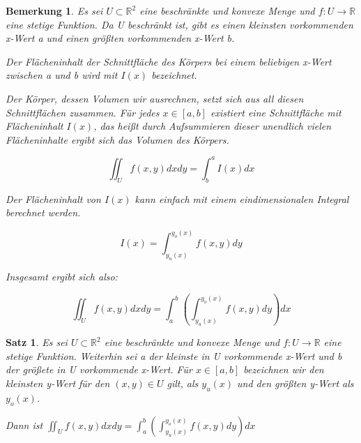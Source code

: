 \documentclass[12pt,a4paper]{scrreprt}
\newtheorem{bemerkung}[defi]{Bemerkung}
\newtheorem{satz}[defi]{Satz}
\begin{document}
	\begin{bemerkung}

		Es sei $U\subset\mathbb{R}^2$ eine beschränkte und konvexe Menge und $f:U\to\mathbb{R}$ eine stetige Funktion. Da U beschränkt ist, gibt es einen kleinsten vorkommenden x-Wert a und einen größten vorkommenden x-Wert b.

		Der Flächeninhalt der Schnittfläche des Körpers bei einem beliebigen x-Wert zwischen a und b wird mit $I(x)$ bezeichnet.

		Der Körper, dessen Volumen wir ausrechnen, setzt sich aus all diesen Schnittflächen zusammen. Für jedes $x\in [a,b]$ existiert eine Schnittfläche mit Flächeninhalt $I(x)$, das heißt durch Aufsummieren dieser unendlich vielen Flächeninhalte ergibt sich das Volumen des Körpers.

		\[\iint_U f(x,y)dxdy = \int^a_b I(x)dx\]

		Der Flächeninhalt von $I(x)$ kann einfach mit einem eindimensionalen Integral berechnet werden.

		\[I(x) = \int^{y_o(x)}_{y_u(x)} f(x,y)dy \]

		Insgesamt ergibt sich also:

		\[\iint_U f(x,y)dxdy = \int^b_a \left(\int^{y_o(x)}_{y_u(x)} f(x,y)dy\right)dx\]
	\end{bemerkung}

	\begin{satz}
		Es sei $U\subset\mathbb{R}^2$ eine beschränkte und konvexe Menge und $f:U\to\mathbb{R}$ eine stetige Funktion. Weiterhin sei a der kleinste in U vorkommende x-Wert und b der größete in U vorkommende x-Wert. Für $x\in [a,b]$ bezeichnen wir den kleinsten y-Wert für den $(x,y) \in U$ gilt, als $y_u(x)$ und den größten y-Wert als $y_o(x)$.

		Dann ist $\iint_U f(x,y)dxdy = \int^b_a \left(\int^{y_o(x)}_{y_u(x)} f(x,y)dy\right)dx$
	\end{satz}
\end{document}
